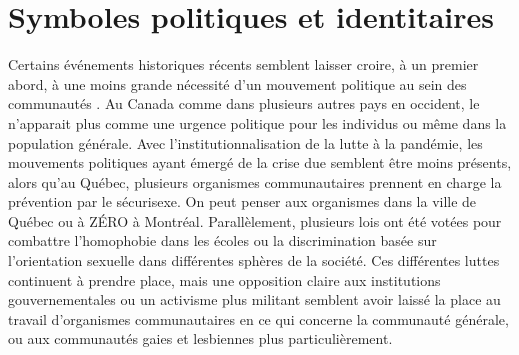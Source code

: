 \section{Symboles politiques et identitaires}
\label{sec:symboles_politiques_et_identitaire}
Certains événements historiques récents semblent laisser croire, à un premier abord, à une moins grande nécessité d'un mouvement politique au sein des communautés \lgbt{}.
Au Canada comme dans plusieurs autres pays en occident, le \sida{} n'apparait plus comme une urgence politique pour les individus \lgbt{} ou même dans la population générale.
Avec l'institutionnalisation de la lutte à la pandémie, les mouvements politiques ayant émergé de la crise due \vih{} semblent être moins présents, alors qu'au Québec, plusieurs organismes communautaires prennent en charge la prévention par le sécurisexe.
On peut penser aux organismes \miels{} dans la ville de Québec ou à ZÉRO à Montréal.
Parallèlement, plusieurs lois ont été votées pour combattre l'homophobie dans les écoles ou la discrimination basée sur l'orientation sexuelle dans différentes sphères de la société.
Ces différentes luttes continuent à prendre place, mais une opposition claire aux institutions gouvernementales ou un activisme plus militant semblent avoir laissé la place au travail d'organismes communautaires en ce qui concerne la communauté \lgbt{} générale, ou aux communautés gaies et lesbiennes plus particulièrement.

